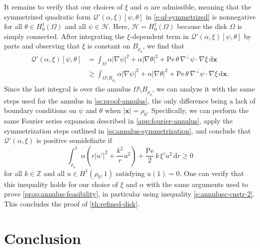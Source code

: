 \documentclass[a4paper, 10pt]{amsart}
\numberwithin{equation}{section}
\theoremstyle{plain}
\theoremstyle{definition}
\theoremstyle{remark}
\newcommand{\cal}[1]{\mathcal{#1}}
\newcommand{\Z}{\mathbb{Z}}
\newcommand{\Pe}{\mathrm{Pe}}
\newcommand{\Hoz}{H_0^1(\Omega)}
\newcommand{\QF}{\mathcal{Q}}
\renewcommand{\vec}[1]{\mathbf{#1}}
\newcommand{\abs}[1]{\left\vert #1 \right\vert}
\newcommand{\dx}{\mathrm{d} \vec{x}}
\newcommand{\dr}{\mathrm{d} r}
\newcommand{\avg}[1]{\int_\Omega #1 \,\dx}
\begin{document}
It remains to verify that our choices of $\xi$ and $\alpha$ are admissible, meaning that the symmetrized quadratic form $\QF'(\alpha,\xi)[\psi,\theta]$ in \cref{e:qf-symmetrized} is nonnegative for all $\theta\in\Hoz$ and all $\psi \in \cal{H}$. Here, $\cal{H}=\Hoz$ because the disk $\Omega$ is simply connected. After integrating the $\xi$-dependent term in $\QF'(\alpha,\xi)[\psi,\theta]$ by parts and observing that $\xi$ is constant on $B_{\rho_0}$, we find that
\begin{align*}
    \QF'(\alpha,\xi)[\psi,\theta]
    &= 
    \avg{ \alpha |\nabla \psi|^2 + \alpha \abs{\nabla\theta}^2 + \Pe\,\theta \, \nabla^\perp \psi \cdot \nabla \xi}
    \\
    &\geq 
    \int_{\Omega \setminus B_{\rho_0}} { \alpha|\nabla \psi|^2 + \alpha \abs{\nabla\theta}^2 + \Pe\,\theta \, \nabla^\perp \psi \cdot \nabla \xi} \,\dx.
\end{align*}
Since the last integral is over the annulus $\Omega \setminus B_{\rho_0}$, we can analyze it with the same steps used for the annulus in \cref{ss:proof-annulus}, the only difference being a lack of boundary conditions on $\psi$ and $\theta$ when $\abs{\vec{x}}=\rho_0$. Specifically, we can perform the same Fourier series expansion described in \cref{app:fourier-annulus}, apply the symmetrization steps outlined in \cref{ss:annulus-symmetrization}, and conclude that $\QF'(\alpha,\xi)$ is positive semidefinite if
\begin{equation*}
    \int_{\rho_0}^1 
        \alpha \left(r|u'|^2+ \frac{k^2}{r}u^2 \right)
        + \frac{\Pe}2 \,k\, \xi' u^2 \, \dr \geq 0
\end{equation*}
for all $k \in \Z$ and all $u\in H^1(\rho_0,1)$ satisfying $u(1)=0$. One can verify that this inequality holds for our choice of $\xi$ and $\alpha$ with the same arguments used to prove \cref{prop:annulus-feasibility}, in particular using inequality \cref{e:annulusc-cnstr-2}. This concludes the proof of \cref{th:refined-disk}.
\section{Conclusion}\label{s:conclusion}
\end{document}
